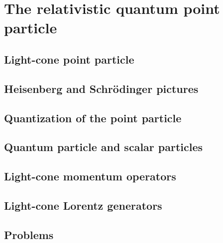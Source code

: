 \documentclass[12pt]{report}
\begin{document}
\chapter{The relativistic quantum point particle}
\newpage
\section{Light-cone point particle}
\section{Heisenberg and Schrödinger pictures}
\section{Quantization of the point particle}
\section{Quantum particle and scalar particles}
\section{Light-cone momentum operators}
\section{Light-cone Lorentz generators}
\section{Problems}
\end{document}

